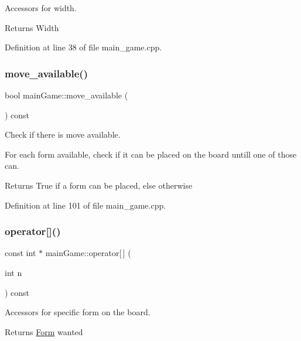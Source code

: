 Accessors for width. 

\begin{DoxyReturn}{Returns}
Width 
\end{DoxyReturn}


Definition at line 38 of file main\+\_\+game.\+cpp.

\hypertarget{classmain_game_a87020eebf5c467534d888a4053ea4603}{}\label{classmain_game_a87020eebf5c467534d888a4053ea4603} 
\subsubsection{\texorpdfstring{move\+\_\+available()}{move\_available()}}
{\footnotesize\ttfamily bool main\+Game\+::move\+\_\+available (\begin{DoxyParamCaption}{ }\end{DoxyParamCaption}) const}



Check if there is move available. 

For each form available, check if it can be placed on the board untill one of those can.

\begin{DoxyReturn}{Returns}
True if a form can be placed, else otherwise 
\end{DoxyReturn}


Definition at line 101 of file main\+\_\+game.\+cpp.

\hypertarget{classmain_game_aad5671e093ad653e8fb301287ebd83f4}{}\label{classmain_game_aad5671e093ad653e8fb301287ebd83f4} 
\subsubsection{\texorpdfstring{operator[]()}{operator[]()}}
{\footnotesize\ttfamily const int $\ast$ main\+Game\+::operator\mbox{[}$\,$\mbox{]} (\begin{DoxyParamCaption}\item[{int}]{n }\end{DoxyParamCaption}) const}



Accessors for specific form on the board. 

\begin{DoxyReturn}{Returns}
\hyperlink{class_form}{Form} wanted 
\end{DoxyReturn}


